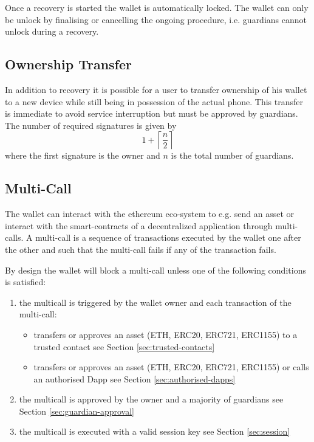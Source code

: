 \documentclass[12pt]{article}
\begin{document}
Once a recovery is started the wallet is automatically locked. The wallet can only be unlock by finalising or cancelling the ongoing procedure, i.e. guardians cannot unlock during a recovery.

\subsection{Ownership Transfer}

In addition to recovery it is possible for a user to transfer ownership of his wallet to a new device while still being in possession of the actual phone. This transfer is immediate to avoid service interruption but must be approved by guardians. The number of required signatures is given by
\begin{equation*}
    1+\left\lceil {\frac{n}{2}} \right\rceil
\end{equation*}
where the first signature is the owner and $n$ is the total number of guardians.

\subsection{Multi-Call}

The wallet can interact with the ethereum eco-system to e.g. send an asset or interact with the smart-contracts of a decentralized application through multi-calls. A multi-call is a sequence of transactions executed by the wallet one after the other and such that the multi-call fails if any of the transaction fails.

By design the wallet will block a multi-call unless one of the following conditions is satisfied:
\begin{enumerate}
    \item the multicall is triggered by the wallet owner and each transaction of the multi-call:
    \begin{itemize}
        \item transfers or approves an asset (ETH, ERC20, ERC721, ERC1155) to a trusted contact see Section \ref{sec:trusted-contacts}
        \item transfers or approves an asset (ETH, ERC20, ERC721, ERC1155) or calls an authorised Dapp see Section \ref{sec:authorised-dapps}
    \end{itemize}
    \item the multicall is approved by the owner and a majority of guardians see Section \ref{sec:guardian-approval} 
    \item the multicall is executed with a valid session key see Section \ref{sec:session}
\end{enumerate}
\end{document}
